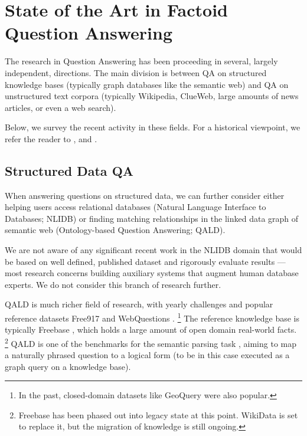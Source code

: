 \chapter{State of the Art in Factoid Question Answering}
\label{ch:survey}

The research in Question Answering has been proceeding in several,
largely independent, directions.  The main division is between QA
on structured knowledge bases (typically graph databases like the
semantic web) and QA on unstructured text corpora (typically
Wikipedia, ClueWeb, large amounts of news articles, or even
a web search).

Below, we survey the recent activity in these fields.
For a historical viewpoint, we refer the reader to
\cite{SurveyWang}, \cite{SurveyAllam} and \cite{SurveyLopeza}.


\section{Structured Data QA}
\label{sec:structured}

When answering questions on structured data, we can further
consider either helping users access relational databases (Natural Language Interface to Databases; NLIDB)
or finding matching relationships in the linked data graph of semantic web (Ontology-based Question Answering; QALD).

We are not aware of any significant recent work in the NLIDB domain
that would be based on well defined, published dataset and rigorously
evaluate results --- most research concerns building auxiliary systems
that augment human database experts. \citep{BergamaschiKeymantic, BlunschiSODA}
We do not consider this branch of research further.

QALD is much richer field of research, with yearly challenges \citep{QALD} and
popular reference datasets Free917 \citep{Free917} and WebQuestions \citep{WebQuestions}.%
\footnote{In the past, closed-domain datasets like GeoQuery were also popular.}
The reference knowledge base is typically Freebase \citep{Freebase},
which holds a large amount of open domain real-world facts.%
\footnote{Freebase has been phased out into legacy state at this point.
	WikiData is set to replace it, but the migration of knowledge
	is still ongoing.}
QALD is one of the benchmarks for the semantic parsing task \citep{SPIntro}, aiming
to map a naturally phrased question to a logical form (to be in this case
executed as a graph query on a knowledge base).
\citep{SPBerant2014Paraphrase, Semantic2014Bordes}

